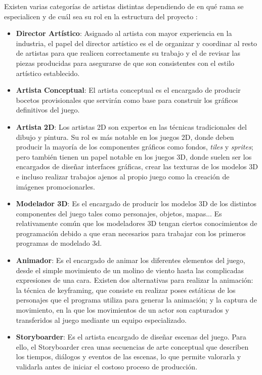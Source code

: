 Existen varias categorías de artistas distintas dependiendo de en qué rama se especialicen y de cuál sea su rol en la estructura del proyecto \cite{development_and_production}:
\begin{itemize}
\item \textbf{Director Artístico}: Asignado al artista con mayor experiencia en la industria, el papel del director artístico es el de organizar y coordinar al resto de artistas para que realicen correctamente su trabajo y el de revisar las piezas producidas para asegurarse de que son consistentes con el estilo artístico establecido.
\item \textbf{Artista Conceptual}: El artista conceptual es el encargado de producir bocetos provisionales que servirán como base para construir los gráficos definitivos del juego.
\item \textbf{Artista 2D}: Los artistas 2D son expertos en las técnicas tradicionales del dibujo y pintura.  Su rol es más notable en los juegos 2D, donde deben producir la mayoría de los componentes gráficos como fondos, \textit{tiles} y \textit{sprites}; pero también tienen un papel notable en los juegos 3D, donde suelen ser los encargados de diseñar interfaces gráficas, crear las texturas de los modelos 3D e incluso realizar trabajos ajenos al propio juego como la creación de imágenes promocionarles.
\item \textbf{Modelador 3D}: Es el encargado de producir los modelos 3D de los distintos componentes del juego tales como personajes, objetos, mapas...  Es relativamente común que los modeladores 3D tengan ciertos conocimientos de programación debido a que eran necesarios para trabajar con los primeros programas de modelado 3d.
\item \textbf{Animador}: Es el encargado de animar los diferentes elementos del juego, desde el simple movimiento de un molino de viento hasta las complicadas expresiones de una cara. Existen dos alternativas para realizar la animación: la técnica de keyframing, que consiste en realizar poses estáticas de los personajes que el programa utiliza para generar la animación; y la captura de movimiento, en la que los movimientos de un actor son capturados y transferidos al juego mediante un equipo especializado.
\item \textbf{Storyboarder}: Es el artista encargado de diseñar escenas del juego. Para ello, el Storyboarder crea unas secuencias de arte conceptual que describen los tiempos, diálogos y eventos de las escenas, lo que permite valorarla y validarla antes de iniciar el costoso proceso de producción.
\end{itemize}
